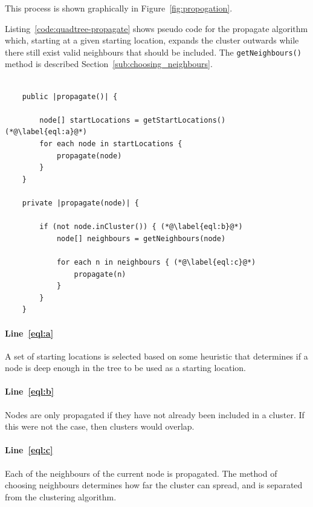 This process is shown graphically in Figure~\ref{fig:propogation}.

Listing~\ref{code:quadtree-propagate} shows pseudo code for the propagate
algorithm which, starting at a given starting location, expands the cluster
outwards while there still exist valid neighbours that should be included. The
\texttt{getNeighbours()} method is described
Section~\ref{sub:choosing_neighbours}.

\begin{center}
\begin{minipage}{\textwidth}
\begin{lstlisting}[caption={[Code for the propagate algorithm.]Code for the
	propagate algorithm which expands an initial starting location to a
	cluster.}, label=code:quadtree-propagate]

	public |propagate()| {

		node[] startLocations = getStartLocations() (*@\label{eql:a}@*)
		for each node in startLocations {
			propagate(node)
		}
	}

	private |propagate(node)| {

		if (not node.inCluster()) { (*@\label{eql:b}@*)
			node[] neighbours = getNeighbours(node)

			for each n in neighbours { (*@\label{eql:c}@*)
				propagate(n)
			}
		}
	}
\end{lstlisting}
\end{minipage}
\end{center}

\paragraph{Line~\ref{eql:a}} A set of starting locations is selected based on
some heuristic that determines if a node is deep enough in the tree to be used
as a starting location.

\paragraph{Line~\ref{eql:b}} Nodes are only propagated if they have not already
been included in a cluster. If this were not the case, then clusters would
overlap.

\paragraph{Line~\ref{eql:c}} Each of the neighbours of the current node is
propagated. The method of choosing neighbours determines how far the cluster
can spread, and is separated from the clustering algorithm.


